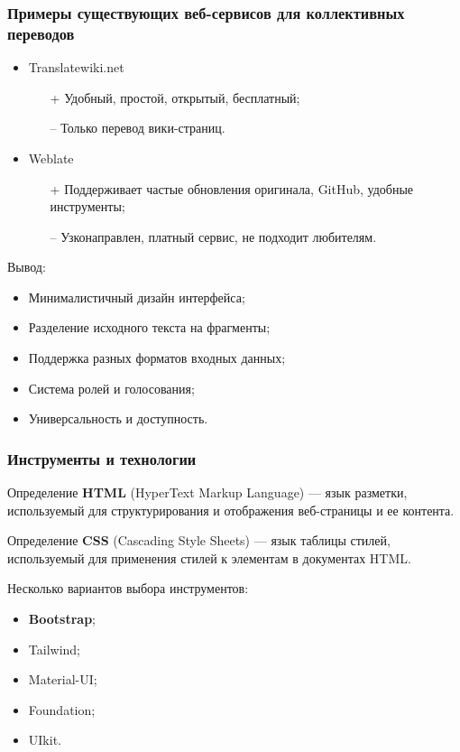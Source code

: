 \documentclass[hyperref={unicode}]{beamer}
\begin{document}
\begin{frame}
	\frametitle{Примеры существующих веб-сервисов для коллективных переводов}
	\begin{itemize}
		\item Translatewiki.net
		\begin{itemize}
			\item[+] Удобный, простой, открытый, бесплатный;
			\item[--] Только перевод вики-страниц.
		\end{itemize}
		\item Weblate
		\begin{itemize}
			\item[+] Поддерживает частые обновления оригинала, GitHub, удобные инструменты;
			\item[--] Узконаправлен, платный сервис, не подходит любителям.
		\end{itemize}
	\end{itemize}
	Вывод:
	\begin{itemize}
		\item Минималистичный дизайн интерфейса;
		\item Разделение исходного текста на фрагменты;
		\item Поддержка разных форматов входных данных;
		\item Система ролей и голосования;
		\item Универсальность и доступность.
	\end{itemize}
\end{frame}


\begin{frame}
	\frametitle{Инструменты и технологии}
	\begin{block}{Определение}
		\textbf{HTML} (HyperText Markup Language) — язык разметки, используемый для структурирования и отображения веб-страницы и ее контента.
	\end{block}
	\begin{block}{Определение}
		\textbf{CSS} (Cascading Style Sheets) — язык таблицы стилей, используемый для применения стилей к элементам в документах HTML.
	\end{block}
	Несколько вариантов выбора инструментов:
	\begin{itemize}
		\item \textbf{Bootstrap};
		\item Tailwind;
		\item Material-UI;
		\item Foundation;
		\item UIkit.
	\end{itemize}
\end{frame}
\end{document}
